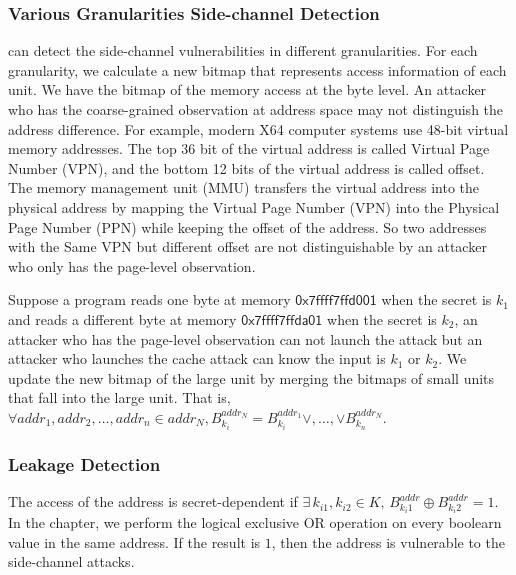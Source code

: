 \subsubsection{Various Granularities Side-channel Detection}
\ctool{} can detect the side-channel vulnerabilities in different granularities. For each granularity, we calculate a new bitmap that represents access information of each unit. We have the bitmap of the memory access at the byte level. An attacker who has the coarse-grained observation at address space may not distinguish the address difference. For example, modern X64 computer systems use 48-bit virtual memory addresses. The top 36 bit of the virtual address is called Virtual Page Number (VPN), and the bottom 12 bits of the virtual address is called offset. The memory management unit (MMU) transfers the virtual address into the physical address by mapping the Virtual Page Number (VPN) into the Physical Page Number (PPN) while keeping the offset of the address. So two addresses with the Same VPN but different offset are not distinguishable by an attacker who only has the page-level observation.

Suppose a program reads one byte at memory $\mathsf{0x7ffff7ffd001}$ when the secret is $k_1$ and reads a different byte at memory $\mathsf{0x7ffff7ffda01}$ when the secret is $k_2$, an attacker who has the page-level observation can not launch the attack but an attacker who launches the cache attack can know the input is $k_1$ or $k_2$. We update the new bitmap of the large unit by merging the bitmaps of small units that fall into the large unit. That is, $\forall addr_1, addr_2, \dots, addr_n \in addr_N, B^{addr_N}_{k_i} = B^{addr_1}_{k_i} \lor,\dots,\lor B^{addr_N}_{k_n}$.


\subsubsection{Leakage Detection} The access of the address is secret-dependent if $ \exists\, k_{i1}, k_{i2} \in K, \, B^{addr}_{k_i1} \oplus  B^{addr}_{k_i2} =1 $. In the chapter, we perform the logical exclusive OR operation on every boolearn value in the same address. If the result is $1$, then the address is vulnerable to the side-channel attacks.

